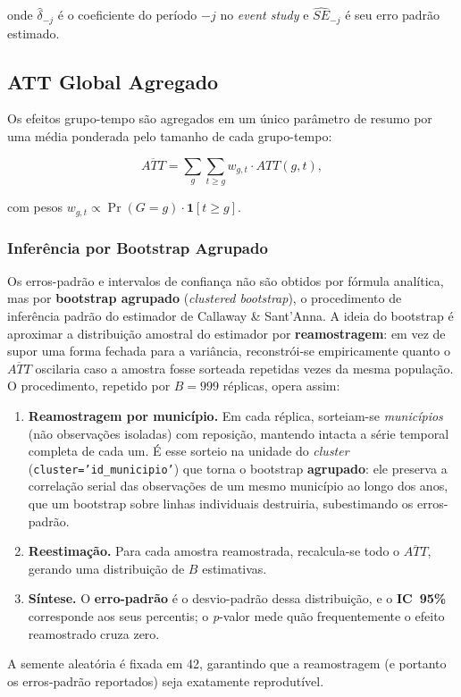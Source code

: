 \documentclass[twocolumn, 10pt]{article}
\begin{document}
\noindent onde $\hat{\delta}_{-j}$ é o coeficiente do período $-j$ no
\textit{event study} e $\widehat{SE}_{-j}$ é seu erro padrão estimado.

\subsection{ATT Global Agregado}

Os efeitos grupo-tempo são agregados em um único parâmetro de resumo por
uma média ponderada pelo tamanho de cada grupo-tempo:

\begin{equation}
\overline{ATT} = \sum_{g} \sum_{t \geq g} w_{g,t} \cdot ATT(g, t),
\label{eq:att_global}
\end{equation}

\noindent com pesos $w_{g,t} \propto \Pr(G = g) \cdot \mathbf{1}[t \geq g]$.

\subsubsection{Inferência por Bootstrap Agrupado}
\label{sec:bootstrap}
Os erros-padrão e intervalos de confiança não são obtidos por fórmula analítica,
mas por \textbf{bootstrap agrupado} (\textit{clustered bootstrap}), o
procedimento de inferência padrão do estimador de Callaway \& Sant'Anna. A ideia
do bootstrap é aproximar a distribuição amostral do estimador por
\textbf{reamostragem}: em vez de supor uma forma fechada para a variância,
reconstrói-se empiricamente quanto o $\overline{ATT}$ oscilaria caso a amostra
fosse sorteada repetidas vezes da mesma população. O procedimento, repetido por
$B = 999$ réplicas, opera assim:
\begin{enumerate}
  \item \textbf{Reamostragem por município.} Em cada réplica, sorteiam-se
        \textit{municípios} (não observações isoladas) com reposição, mantendo
        intacta a série temporal completa de cada um. É esse sorteio na unidade
        do \textit{cluster} (\texttt{cluster='id\_municipio'}) que torna o
        bootstrap \textbf{agrupado}: ele preserva a correlação serial das
        observações de um mesmo município ao longo dos anos, que um bootstrap
        sobre linhas individuais destruiria, subestimando os erros-padrão.
  \item \textbf{Reestimação.} Para cada amostra reamostrada, recalcula-se todo o
        $\overline{ATT}$, gerando uma distribuição de $B$ estimativas.
  \item \textbf{Síntese.} O \textbf{erro-padrão} é o desvio-padrão dessa
        distribuição, e o \textbf{IC~95\%} corresponde aos seus percentis; o
        \textit{p}-valor mede quão frequentemente o efeito reamostrado cruza zero.
\end{enumerate}
A semente aleatória é fixada em 42, garantindo que a reamostragem (e portanto os
erros-padrão reportados) seja exatamente reprodutível.
\end{document}
